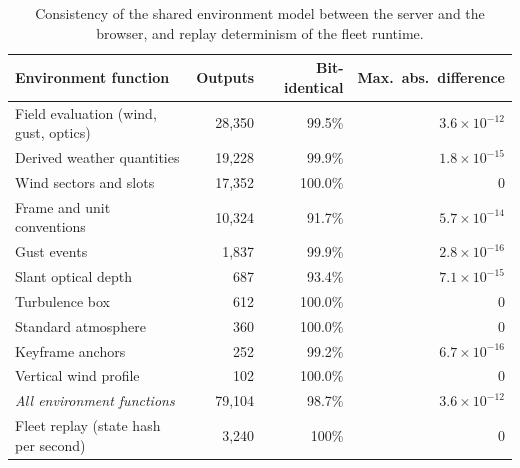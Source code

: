 \begin{table}[t]
\caption{Consistency of the shared environment model between the server and the browser, and replay determinism of the fleet runtime.}\label{tab:consistency}
\footnotesize
\begin{tabular*}{\textwidth}{@{\extracolsep{\fill}}lrrr@{}}
\toprule
Environment function & Outputs & Bit-identical & Max.\ abs.\ difference \\
\midrule
Field evaluation (wind, gust, optics) & 28,350 & 99.5\% & $3.6\times10^{-12}$ \\
Derived weather quantities & 19,228 & 99.9\% & $1.8\times10^{-15}$ \\
Wind sectors and slots & 17,352 & 100.0\% & 0 \\
Frame and unit conventions & 10,324 & 91.7\% & $5.7\times10^{-14}$ \\
Gust events & 1,837 & 99.9\% & $2.8\times10^{-16}$ \\
Slant optical depth & 687 & 93.4\% & $7.1\times10^{-15}$ \\
Turbulence box & 612 & 100.0\% & 0 \\
Standard atmosphere & 360 & 100.0\% & 0 \\
Keyframe anchors & 252 & 99.2\% & $6.7\times10^{-16}$ \\
Vertical wind profile & 102 & 100.0\% & 0 \\
\emph{All environment functions} & 79,104 & 98.7\% & $3.6\times10^{-12}$ \\
\midrule
Fleet replay (state hash per second) & 3,240 & 100\% & 0 \\
\bottomrule
\end{tabular*}
\end{table}
